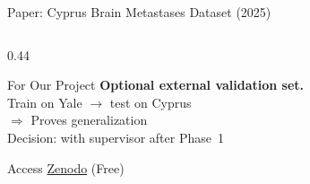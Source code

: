\documentclass[aspectratio=169,xcolor=dvipsnames]{beamer}
\begin{document}
\begin{frame}{Paper: Cyprus Brain Metastases Dataset (2025)}
\begin{columns}
\begin{column}{0.44\textwidth}
            \vspace{0.2em}

            \begin{alertblock}{For Our Project}
                \small
                \textbf{Optional external validation set.}\\
                Train on Yale $\to$ test on Cyprus\\
                $\Rightarrow$ Proves generalization\\
                {\scriptsize Decision: with supervisor after Phase~1}
            \end{alertblock}

            \begin{exampleblock}{\scriptsize {} Access}
                \scriptsize \href{https://zenodo.org/}{Zenodo} (Free)
            \end{exampleblock}
        \end{column}
    \end{columns}
\end{frame}
\end{document}
